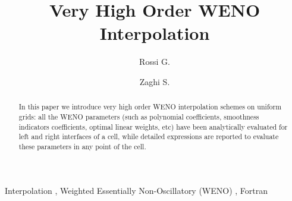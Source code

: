 \documentclass[pdftex,preprint,3p,times,numbers]{elsarticle}
\begin{document}
\begin{frontmatter}

\title{Very High Order WENO Interpolation}

\author[dima]{Rossi G.}
\address[dima]{Dipartimento di Ingegneria Meccanica e Aerospaziale, Università degli Studi di Roma ''Sapienza'', Via Eudossiana 18, Rome, Italy, 00184}

\author[insean]{Zaghi S.}
\address[insean]{CNR-INSEAN, Istituto Nazionale per Studi ed Esperienze di Architettura Navale, Via di Vallerano 139, Rome, Italy, 00128}

\begin{abstract}

In this paper we introduce very high order WENO interpolation schemes on uniform grids: all the WENO parameters (such as polynomial coefficients, smoothness indicators coefficients, optimal linear weights, etc) have been analytically evaluated for left and right interfaces of a cell, while detailed expressions are reported to evaluate these parameters in any point of the cell.

\end{abstract}

\begin{keyword}
  Interpolation \sep
  Weighted Essentially Non-Oscillatory (WENO) \sep
  Fortran
\end{keyword}

\end{frontmatter}



\clearpage



\clearpage

%

\clearpage

%

\clearpage

%

\clearpage

%

\appendix

%



\end{document}
